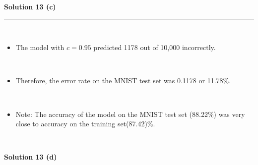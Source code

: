 \documentclass{article}
\begin{document}
\newpage
\parbox{\textwidth}{\textbf{Solution 13 (c)}}
\noindent\rule{\textwidth}{0.4pt}\\
\begin{itemize}
    \item \parbox{\textwidth}{The model with $c=0.95$ predicted 1178 out of 10,000 incorrectly.}\\
    \item \parbox{\textwidth}{Therefore, the error rate on the MNIST test set was 0.1178 or 11.78\%.}\\
    \item \parbox{\textwidth}{Note: The accuracy of the model on the MNIST test set (88.22\%) was very close to accuracy on the training set(87.42)\%.}\\
\end{itemize}

\newpage
\parbox{\textwidth}{\textbf{Solution 13 (d)}}
\end{document}
